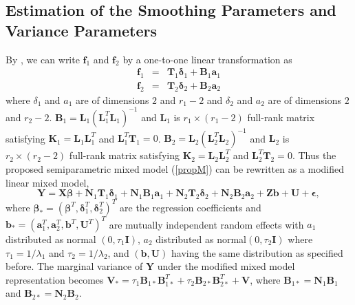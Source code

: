 \documentclass[article,lineno]{biometrika}
\begin{document}
\subsection{Estimation of the Smoothing Parameters and Variance Parameters} \label{estSmoo}

By \cite{Green:1987}, we can write $\boldsymbol f_1$ and $\boldsymbol f_2$ by a one-to-one linear transformation as 
\begin{eqnarray*}
\boldsymbol f_1 &=& \boldsymbol T_1 \boldsymbol \delta_1 + \boldsymbol B_1 \boldsymbol a_1 \\
\boldsymbol f_2 &=& \boldsymbol T_2 \boldsymbol \delta_2 + \boldsymbol B_2 \boldsymbol a_2 
\end{eqnarray*}
where $\delta_1$ and $a_1$ are of dimensions $2$ and $r_1 - 2$ and $\delta_2$ and $a_2$ are of dimensions $2$ and $r_2 - 2$.  
$\boldsymbol B_1 = \boldsymbol L_1 (\boldsymbol L_1^T \boldsymbol L_1)^{-1}$ and $\boldsymbol L_1$ is $r_1 \times (r_1-2)$ full-rank matrix satisfying $\boldsymbol K_1 = \boldsymbol L_1 \boldsymbol L_1^T$ and 
$\boldsymbol L_1^T \boldsymbol T_1 = 0$. 
$\boldsymbol B_2 = \boldsymbol L_2 (\boldsymbol L_2^T \boldsymbol L_2)^{-1}$ and $\boldsymbol L_2$ is $r_2 \times (r_2-2)$ full-rank matrix satisfying $\boldsymbol K_2 = \boldsymbol L_2\boldsymbol L_2^T$ and 
$\boldsymbol L_2^T \boldsymbol T_2 = 0$. 
Thus the proposed semiparametric mixed model (\ref{propM}) can be rewritten as a modified linear mixed model, 
\begin{equation} \label{modLME}
\boldsymbol Y = \boldsymbol X \boldsymbol \beta 
+ \boldsymbol N_1 \boldsymbol T_1 \boldsymbol \delta_1 + \boldsymbol N_1 \boldsymbol B_1 \boldsymbol a_1
+ \boldsymbol N_2 \boldsymbol T_2 \boldsymbol \delta_2 + \boldsymbol N_2 \boldsymbol B_2 \boldsymbol a_2
+ \boldsymbol Z \boldsymbol b + \boldsymbol U + \boldsymbol \epsilon,
\end{equation}
where $\boldsymbol \beta_* = (\boldsymbol \beta^T, \boldsymbol \delta_1^T, \boldsymbol \delta_2^T)^T$ are the regression coefficients and 
$\boldsymbol b_* = (\boldsymbol a_1^T,  \boldsymbol a_2^T, \boldsymbol b^T, \boldsymbol U^T)^T$  are mutually independent random effects with $a_1$ distributed as normal
$(0, \tau_1 \boldsymbol I)$,
$a_2$ distributed as normal$(0, \tau_2 \boldsymbol I)$ where $\tau_1 = 1/\lambda_1$ and $\tau_2 = 1/\lambda_2$, and $(\boldsymbol b, \boldsymbol U)$ having the same distribution as specified before. 
The marginal variance of $\boldsymbol Y$ under the modified mixed model representation becomes 
$\boldsymbol V_* = \tau_1 \boldsymbol B_{1*} \boldsymbol B_{1*}^T +  \tau_2 \boldsymbol B_{2*} \boldsymbol B_{2*}^T + \boldsymbol V$, 
where 
$\boldsymbol B_{1*} = \boldsymbol N_1 \boldsymbol B_1$
and 
$\boldsymbol B_{2*} = \boldsymbol N_2 \boldsymbol B_2$.
\end{document}
